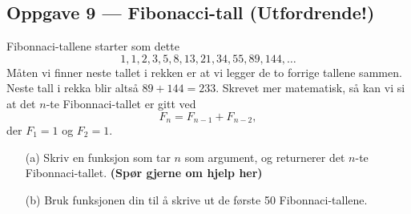 \documentclass[a4paper, 11pt, notitlepage]{article}
\begin{document}
\subsection*{Oppgave 9 --- Fibonacci-tall (Utfordrende!)}
Fibonnaci-tallene starter som dette
$$1, 1, 2, 3, 5, 8, 13, 21, 34, 55, 89, 144, \ldots$$
Måten vi finner neste tallet i rekken er at vi legger de to forrige tallene sammen. Neste tall i rekka blir altså $89+144 = 233$. Skrevet mer matematisk, så kan vi si at det $n$-te Fibonnaci-tallet er gitt ved
$$F_n = F_{n-1} + F_{n-2},$$
der $F_1 = 1$ og $F_2 = 1$. 

\begin{itemize}
	\item[(a)] Skriv en funksjon som tar $n$ som argument, og returnerer det $n$-te Fibonnaci-tallet. \textbf{(Spør gjerne om hjelp her)}
	\item[(b)] Bruk funksjonen din til å skrive ut de første 50 Fibonnaci-tallene.
\end{itemize}





\clearpage







\end{document}
